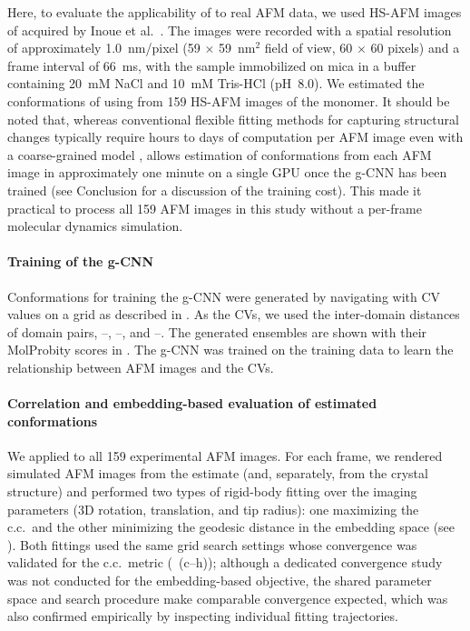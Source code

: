 Here, to evaluate the applicability of \Model to real AFM data, we used HS-AFM images of \flhac acquired by Inoue et al.\ \cite{inoue_structural_2019}.
The images were recorded with a spatial resolution of approximately 1.0~nm/pixel (59 $\times$ 59~nm$^2$ field of view, 60 $\times$ 60 pixels) and a frame interval of 66~ms, with the sample immobilized on mica in a buffer containing 20~mM NaCl and 10~mM Tris-HCl (pH~8.0).
We estimated the conformations of \flhac using \Model from 159 HS-AFM images of the \flhac monomer.
It should be noted that, whereas conventional flexible fitting methods for capturing structural changes typically require hours to days of computation per AFM image even with a coarse-grained model \cite{Niina2020},
\Model allows estimation of conformations from each AFM image in approximately one minute on a single GPU once the g-CNN has been trained (see Conclusion for a discussion of the training cost).
This made it practical to process all 159 AFM images in this study without a per-frame molecular dynamics simulation.

\paragraph{Training of the g-CNN}
Conformations for training the g-CNN were generated by navigating \AFiii with CV values on a grid as described in .
As the CVs, we used the inter-domain distances of domain pairs, \acdi--\acdiv, \acdii--\acdiii, and \acdii--\acdiv.
The generated ensembles are shown with their MolProbity scores in .
The g-CNN was trained on the training data to learn the relationship between AFM images and the CVs.

\paragraph{Correlation and embedding-based evaluation of estimated conformations}
We applied \Model to all 159 experimental AFM images. For each frame, we rendered simulated AFM images from the \Model estimate (and, separately, from the crystal structure) and performed two types of rigid-body fitting over the imaging parameters (3D rotation, translation, and tip radius): one maximizing the c.c.\ and the other minimizing the geodesic distance in the embedding space (see ).
Both fittings used the same grid search settings whose convergence was validated for the c.c.\ metric (~(c--h)); although a dedicated convergence study was not conducted for the embedding-based objective, the shared parameter space and search procedure make comparable convergence expected, which was also confirmed empirically by inspecting individual fitting trajectories.

